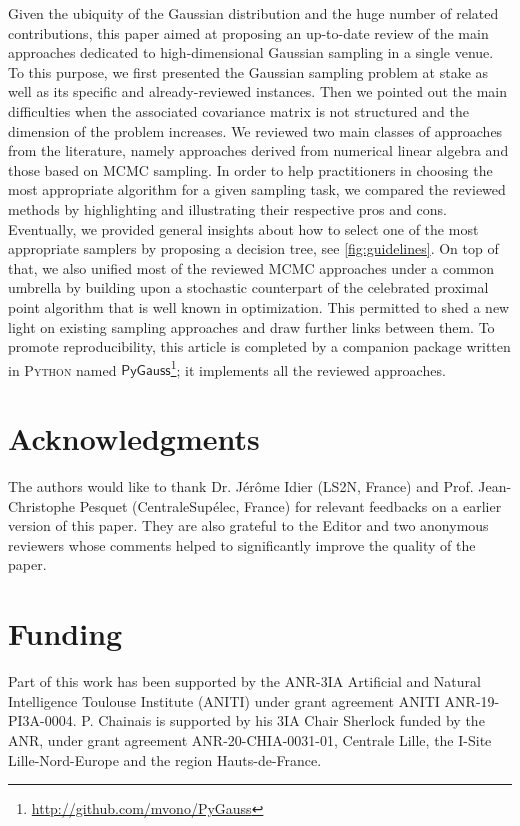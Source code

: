 \documentclass[nohypdvips,onefignum,onetabnum]{siamart171218}
\begin{document}
Given the ubiquity of the Gaussian distribution and the huge number of related contributions, this paper aimed at proposing an up-to-date review of the main approaches dedicated to high-dimensional Gaussian sampling in a single venue.
To this purpose, we first presented the Gaussian sampling problem at stake as well as its specific and already-reviewed instances. Then we pointed out the main difficulties when the associated covariance matrix is not structured and the dimension of the problem increases.  
We reviewed two main classes of approaches from the literature, namely approaches derived from numerical linear algebra and those based on MCMC sampling.
In order to help practitioners in choosing the most appropriate algorithm for a given sampling task, we compared the reviewed methods by highlighting and illustrating their respective pros and cons. Eventually, we provided general insights about how to select one of the most appropriate samplers by proposing a decision tree, see \cref{fig:guidelines}.
On top of that, we also unified most of the reviewed MCMC approaches under a common umbrella by building upon a stochastic counterpart of the celebrated proximal point algorithm that is well known in optimization.
This permitted to shed a new light on existing sampling approaches and draw further links between them.
To promote reproducibility, this article is completed by a companion package written in \textsc{Python}\xspace named $\mathsf{PyGauss}$\footnote{\url{http://github.com/mvono/PyGauss}}; it implements all the reviewed approaches.


\section*{Acknowledgments}
The authors would like to thank Dr. Jérôme Idier (LS2N, France) and Prof. Jean-Christophe Pesquet (CentraleSup\'elec, France) for relevant feedbacks on a earlier version of this paper. They are also grateful to the Editor and two anonymous reviewers whose comments helped to significantly improve the quality of the paper.

\section*{Funding}
Part of this work has been supported by the ANR-3IA Artificial and Natural Intelligence Toulouse Institute (ANITI) under grant agreement ANITI ANR-19-PI3A-0004. P. Chainais is supported by his 3IA Chair Sherlock funded by the ANR, under grant agreement ANR-20-CHIA-0031-01, Centrale Lille, the I-Site Lille-Nord-Europe and the region Hauts-de-France.
\end{document}
